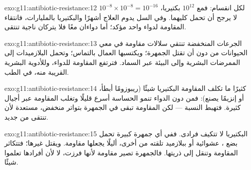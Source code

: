 \begin{solution}{exo:g11:antibiotic-resistance:12}
$10^{-8} \times 10^{-8} = 10^{-16}$ لكل انقسام: فمع $10^{12}$
بكتيريا، لا يرجح أن تحمل  كليهما. وفي السل يدوم العلاج أشهرًا
والبكتيريا بالمليارات، فانتقاء المقاومة لدواء واحد مؤكد؛ أما دواءان
معًا فلا يتركان ناجية تنتقى.
\end{solution}

\begin{solution}{exo:g11:antibiotic-resistance:13}
الجرعات المنخفضة تنتقي سلالات مقاومة في معي الحيوانات من دون أن تقتل
الجمهرة؛ ويكتسبها العمال بالتماس؛ وتحمل البلازميدات  إلى
الممرضات البشرية وإلى البيئة عبر السماد. فترتفع المقاومة للدواء،
وللأدوية البشرية القريبة منه، في الطب.
\end{solution}

\begin{solution}{exo:g11:antibiotic-resistance:14}
كثيرًا ما تكلف المقاومة البكتيريا شيئًا (ريبوزومًا أبطأ، أو إنزيمًا
يصنع): فمن دون الدواء تنمو  الحساسة أسرع قليلًا وتغلب المقاومة
عبر أجيال كثيرة. فتهبط النسبة --- لكن  المقاومة تبقى في
الجمهرة بتواتر منخفض، مستعدة لأن تنتقى من جديد.
\end{solution}

\begin{solution}{exo:g11:antibiotic-resistance:15}
البكتيريا لا تتكيف فرادى. ففي أي جمهرة كبيرة تحمل بضع ، 
عشوائية أو ببلازميد تلقته من  أخرى، أليلًا يجعلها مقاومة. ويقتل
 غيرها؛ فتتكاثر  المقاومة وتنقل  إلى ذريتها.
فالجمهرة تصير مقاومة لأنها فرزت، لا لأن أفرادها تعلموا شيئًا.
\end{solution}

